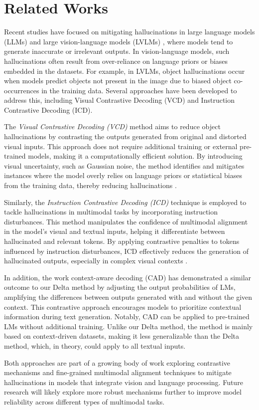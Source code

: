 \section{Related Works}
Recent studies have focused on mitigating hallucinations in large language models (LLMs) and large vision-language models (LVLMs) \cite{hinck2024llavagemmaacceleratingmultimodalfoundation}, where models tend to generate inaccurate or irrelevant outputs. In vision-language models, such hallucinations often result from over-reliance on language priors or biases embedded in the datasets. For example, in LVLMs, object hallucinations occur when models predict objects not present in the image due to biased object co-occurrences in the training data. Several approaches have been developed to address this, including Visual Contrastive Decoding (VCD) and Instruction Contrastive Decoding (ICD).

The \textit{Visual Contrastive Decoding (VCD)} method aims to reduce object hallucinations by contrasting the outputs generated from original and distorted visual inputs. This approach does not require additional training or external pre-trained models, making it a computationally efficient solution. By introducing visual uncertainty, such as Gaussian noise, the method identifies and mitigates instances where the model overly relies on language priors or statistical biases from the training data, thereby reducing hallucinations \cite{Leng_2024_CVPR}.

Similarly, the \textit{Instruction Contrastive Decoding (ICD)} technique is employed to tackle hallucinations in multimodal tasks by incorporating instruction disturbances. This method manipulates the confidence of multimodal alignment in the model's visual and textual inputs, helping it differentiate between hallucinated and relevant tokens. By applying contrastive penalties to tokens influenced by instruction disturbances, ICD effectively reduces the generation of hallucinated outputs, especially in complex visual contexts \cite{Leng_2024_CVPR}.

In addition, the work context-aware decoding (CAD) has \cite{shi-etal-2024-trusting} demonstrated a similar outcome to our Delta method by adjusting the output probabilities of LMs, amplifying the differences between outputs generated with and without the given context. This contrastive approach encourages models to prioritize contextual information during text generation. Notably, CAD can be applied to pre-trained LMs without additional training. Unlike our Delta method, the method is mainly based on context-driven datasets, making it less generalizable than the Delta method, which, in theory, could apply to all textual inputs.

Both approaches are part of a growing body of work exploring contrastive mechanisms and fine-grained multimodal alignment techniques to mitigate hallucinations in models that integrate vision and language processing. Future research will likely explore more robust mechanisms further to improve model reliability across different types of multimodal tasks.